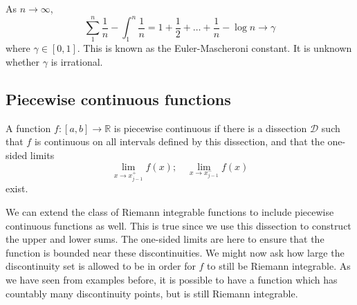 \begin{corollary}
	As \(n \to \infty\),
	\[
		\sum_1^n \frac{1}{n} - \int_1^n \frac{1}{n} = 1 + \frac{1}{2} + \dots + \frac{1}{n} - \log n \to \gamma
	\]
	where \(\gamma \in [0, 1]\).
	This is known as the Euler-Mascheroni constant.
	It is unknown whether \(\gamma\) is irrational.
\end{corollary}

\subsection{Piecewise continuous functions}
\begin{definition}
	A function \(f \colon [a, b] \to \mathbb R\) is piecewise continuous if there is a dissection \(\mathcal D\) such that \(f\) is continuous on all intervals defined by this dissection, and that the one-sided limits
	\[
		\lim_{x \to x_{j-1}^+} f(x);\quad \lim_{x \to x_{j-1}^-} f(x)
	\]
	exist.
\end{definition}
We can extend the class of Riemann integrable functions to include piecewise continuous functions as well.
This is true since we use this dissection to construct the upper and lower sums.
The one-sided limits are here to ensure that the function is bounded near these discontinuities.
We might now ask how large the discontinuity set is allowed to be in order for \(f\) to still be Riemann integrable.
As we have seen from examples before, it is possible to have a function which has countably many discontinuity points, but is still Riemann integrable.
